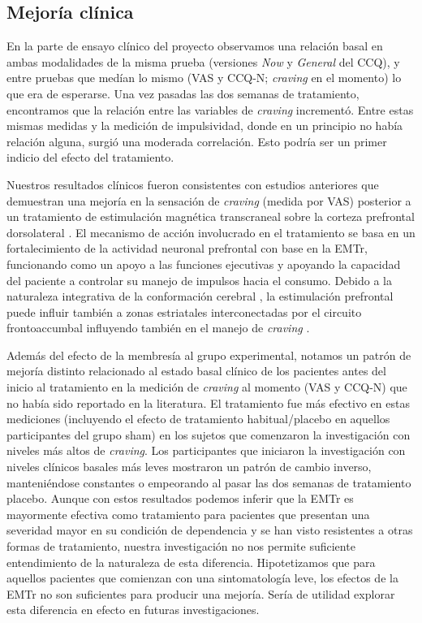 \subsection{Mejoría clínica}
En la parte de ensayo clínico del proyecto observamos una relación basal en ambas modalidades de la misma prueba (versiones \textit{Now} y \textit{General} del CCQ), y entre pruebas que medían lo mismo (VAS y CCQ-N; \textit{craving} en el momento) lo que era de esperarse. Una vez pasadas las dos semanas de tratamiento, encontramos que la relación entre las variables de \textit{craving} incrementó. Entre estas mismas medidas y la medición de impulsividad, donde en un principio no había relación alguna, surgió una moderada correlación. Esto podría ser un primer indicio del efecto del tratamiento.\par
Nuestros resultados clínicos fueron consistentes con estudios anteriores que demuestran una mejoría en la sensación de \textit{craving} (medida por VAS) posterior a un tratamiento de estimulación magnética transcraneal sobre la corteza prefrontal dorsolateral \parencite{Politi2008, Terraneo2016}. El mecanismo de acción involucrado en el tratamiento se basa en un fortalecimiento de la actividad neuronal prefrontal con base en la EMTr, funcionando como un apoyo a las funciones ejecutivas y apoyando la capacidad del paciente a controlar su manejo de impulsos hacia el consumo. Debido a la naturaleza integrativa de la conformación cerebral \parencite{Tononi1994}, la estimulación prefrontal puede influir también a zonas estriatales interconectadas por el circuito frontoaccumbal influyendo también en el manejo de \textit{craving} \parencite{Volkow2010a}. \par
Además del efecto de la membresía al grupo experimental, notamos un patrón de mejoría distinto relacionado al estado basal clínico de los pacientes antes del inicio al tratamiento en la medición de \textit{craving} al momento (VAS y CCQ-N) que no había sido reportado en la literatura.
El tratamiento fue más efectivo en estas mediciones (incluyendo el efecto de tratamiento habitual/placebo en aquellos participantes del grupo sham) en los sujetos que comenzaron la investigación con niveles más altos de \textit{craving}. Los participantes que iniciaron la investigación con niveles clínicos basales más leves mostraron un patrón de cambio inverso, manteniéndose constantes o empeorando al pasar las dos semanas de tratamiento placebo.
Aunque con estos resultados podemos inferir que la EMTr es mayormente efectiva como tratamiento para pacientes que presentan una severidad mayor en su condición de dependencia y se han visto resistentes a otras formas de tratamiento, nuestra investigación no nos permite suficiente entendimiento de la naturaleza de esta diferencia. Hipotetizamos que para aquellos pacientes que comienzan con una sintomatología leve, los efectos de la EMTr no son suficientes para producir una mejoría. Sería de utilidad explorar esta diferencia en efecto en futuras investigaciones.\par

